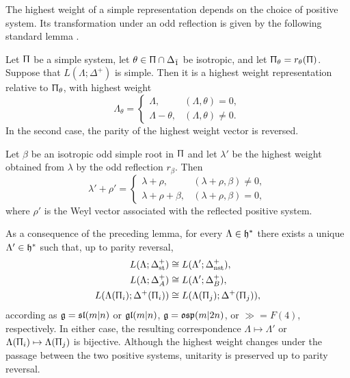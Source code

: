 The highest weight of a simple representation depends on the choice of positive system. Its transformation under an odd reflection is given by the following standard lemma \cite[Lemma~1.40]{cheng2012dualities}.

\begin{lemma}
\label{lemma::relating_highest_weight_representations}
Let $\Uppi$ be a simple system, let $\theta\in\Uppi\cap\Delta_{\bar1}$ be isotropic, and let $\Uppi_\theta=r_\theta(\Uppi)$. Suppose that $L(\Lambda;\Delta^+)$ is simple. Then it is a highest weight representation relative to $\Uppi_\theta$, with highest weight
\begin{equation*}
\Lambda_\theta=
\begin{cases}
\Lambda,&(\Lambda,\theta)=0,\\
\Lambda-\theta,&(\Lambda,\theta)\neq0.
\end{cases}
\label{eq::odd-reflection-highest-weight}
\end{equation*}
In the second case, the parity of the highest weight vector is reversed.
\end{lemma}

\begin{remark}\label{rmk::shifted_odd_reflections}
Let $\beta$ be an isotropic odd simple root in $\Uppi$ and let $\lambda'$ be the highest weight obtained from $\lambda$ by the odd reflection $r_\beta$. Then
\[
\lambda'+\rho'
=
\begin{cases}
\lambda+\rho, & (\lambda+\rho,\beta)\neq 0,\\[1mm]
\lambda+\rho+\beta, & (\lambda+\rho,\beta)=0,
\end{cases}
\]
where $\rho'$ is the Weyl vector associated with the reflected positive system. 
\end{remark}

As a consequence of the preceding lemma, for every
$\Lambda\in\hh^{\ast}$ there exists a unique $\Lambda'\in\hh^{\ast}$
such that, up to parity reversal,
\begin{equation}
\label{eq::equivalence_simples_odd_reflections}
\begin{aligned}
L(\Lambda;\Delta_{\st}^{+})
&\cong
L(\Lambda';\Delta_{\nst}^{+}),
\\
L(\Lambda;\Delta_{A}^{+})
&\cong
L(\Lambda';\Delta_{B}^{+}),
\\
L(\Lambda(\Uppi_{i});\Delta^{+}(\Uppi_{i}))
&\cong
L(\Lambda(\Uppi_{j});\Delta^{+}(\Uppi_{j})),
\end{aligned}
\end{equation}
according as $\gg=\sl(m\vert n)$ or $\gl(m\vert n)$,
$\gg=\osp(m\vert2n)$, or $\gg=F(4)$, respectively. In either case, the resulting correspondence $\Lambda\mapsto\Lambda'$ or $\Lambda(\Uppi_{i})\mapsto \Lambda(\Uppi_{j})$ is bijective. Although the highest weight changes under the passage between the two positive systems, unitarity is preserved up to parity reversal.

